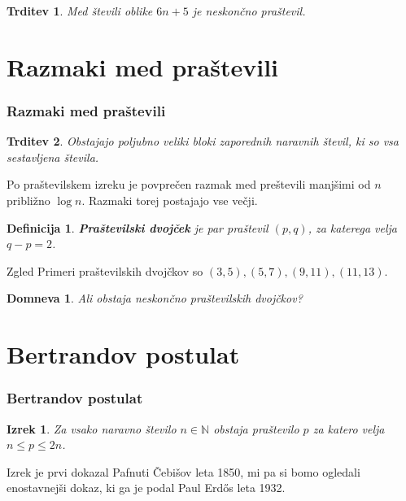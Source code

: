 \documentclass{beamer}
\newtheorem{definicija}{Definicija}
\newtheorem{izrek}{Izrek}
\newtheorem{trditev}{Trditev}
\newtheorem{domneva}{Domneva}
\def\N{\mathbb{N}}
\begin{document}

\begin{frame}
    \begin{trditev}
        Med števili oblike $6n + 5$ je neskončno praštevil.
    \end{trditev}
\end{frame}


\section{Razmaki med praštevili}
\begin{frame}
    \frametitle{Razmaki med praštevili}
    \begin{trditev}
        Obstajajo poljubno veliki bloki zaporednih naravnih števil, ki so vsa sestavljena števila.
    \end{trditev}
    \pause
    \medskip
    Po praštevilskem izreku je povprečen razmak med preštevili manjšimi od $n$ približno $\log{n}$. Razmaki torej postajajo vse večji.
\end{frame}


\begin{frame}
    \begin{definicija}
        \textbf{Praštevilski dvojček} je par praštevil $(p, q)$, za katerega velja $q - p = 2$.
    \end{definicija}
    \pause
    \medskip
    \begin{exampleblock}{Zgled}
        Primeri praštevilskih dvojčkov so $(3, 5), (5, 7), (9, 11), (11, 13)$.
    \end{exampleblock}
    \pause
    \medskip
    \begin{domneva}
        Ali obstaja neskončno praštevilskih dvojčkov?
    \end{domneva}   
\end{frame}


\section{Bertrandov postulat}
\begin{frame}
    \frametitle{Bertrandov postulat}
    \begin{izrek}
        Za vsako naravno število $n \in \N$ obstaja praštevilo $p$ za katero velja $n \leq p \leq 2n$.
    \end{izrek}
    \medskip
    Izrek je prvi dokazal Pafnuti Čebišov leta 1850, mi pa si bomo ogledali enostavnejši dokaz, ki ga je podal Paul Erd\H{o}s leta 1932.
\end{frame}
\end{document}
